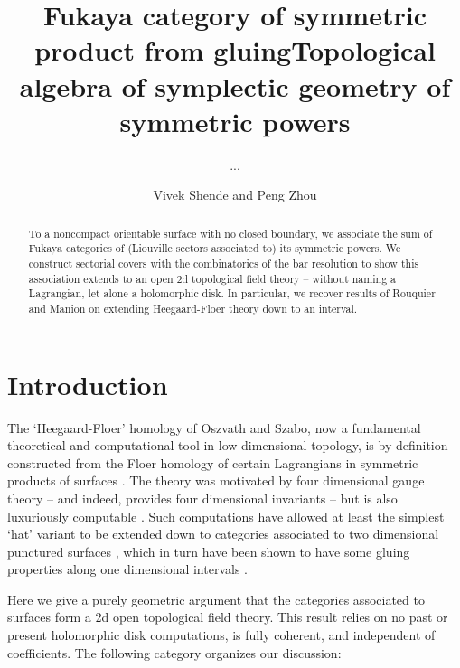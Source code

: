 \documentclass{article}
\title{Fukaya category of symmetric product from gluing}
\author{...}
\title{Topological algebra of symplectic geometry of symmetric powers}
\author{Vivek Shende and Peng Zhou}
\date{}
\theoremstyle{definition}
\begin{document}
\maketitle

\begin{abstract}
    To a noncompact orientable surface with no closed boundary, we associate the sum of Fukaya categories of (Liouville sectors associated to) its symmetric powers.  We construct sectorial covers with the combinatorics of the bar resolution to show this association extends to an open 2d topological field theory -- without naming a Lagrangian, let alone  a holomorphic disk.  
    In particular, we recover results of Rouquier and Manion on extending  Heegaard-Floer theory down to an interval.  
\end{abstract}




\section{Introduction}

The `Heegaard-Floer' homology of Oszvath and Szabo, now a fundamental theoretical and computational tool in low dimensional topology, is by definition constructed from the Floer homology of certain Lagrangians in symmetric products of surfaces \cite{Ozsvath-Szabo-3manifolds, Ozsvath-Szabo-knots}.  The theory was motivated by four dimensional gauge theory -- and indeed,  provides four dimensional invariants \cite{Ozsvath-Szabo-four-manifolds} -- but is also  luxuriously computable \cite{sarkar-wang, manolescu-ozsvath-sarkar}.  Such computations have allowed at least the simplest `hat' variant to be extended down to categories associated to two  dimensional punctured surfaces \cite{Lipschitz-Ozsvath-Thurston}, which in turn have been shown to have some gluing properties along one dimensional intervals \cite{Douglas-Manolescu, Douglas-Lipschitz-Manolescu, rouquier-manion}.  

Here we give a purely geometric argument that the categories associated to surfaces form a 2d open topological field theory. This result relies on no past or present holomorphic disk computations, is fully coherent, and independent of  coefficients.  The following category organizes our discussion: 
\end{document}
